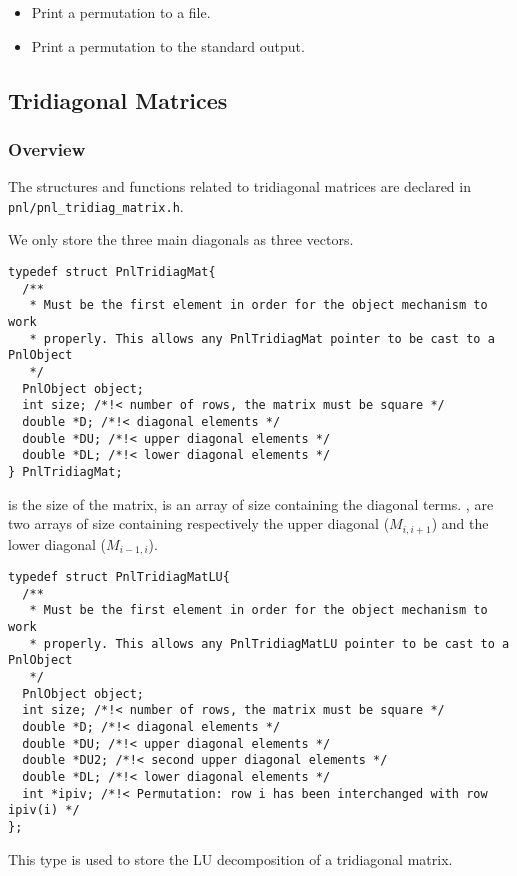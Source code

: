 \begin{itemize}
\item {}
  \sshortdescribe Print a permutation to a file.  

\item {}
  \sshortdescribe Print a permutation to the standard output.  
\end{itemize}



\subsection{Tridiagonal Matrices}
\subsubsection{Overview}

The structures and functions related to tridiagonal matrices are declared in
\verb!pnl/pnl_tridiag_matrix.h!. 

We only store the three main diagonals as three vectors.

\begin{verbatim}
typedef struct PnlTridiagMat{
  /**
   * Must be the first element in order for the object mechanism to work
   * properly. This allows any PnlTridiagMat pointer to be cast to a PnlObject
   */
  PnlObject object; 
  int size; /*!< number of rows, the matrix must be square */
  double *D; /*!< diagonal elements */
  double *DU; /*!< upper diagonal elements */
  double *DL; /*!< lower diagonal elements */
} PnlTridiagMat;
\end{verbatim}
 is the size of the matrix,  is an array of size 
containing the diagonal terms. ,
 are two arrays of size  containing respectively the upper
diagonal ($M_{i, i+1}$) and the lower diagonal ($M_{i-1, i}$). 

\begin{verbatim}
typedef struct PnlTridiagMatLU{
  /** 
   * Must be the first element in order for the object mechanism to work
   * properly. This allows any PnlTridiagMatLU pointer to be cast to a PnlObject
   */
  PnlObject object; 
  int size; /*!< number of rows, the matrix must be square */
  double *D; /*!< diagonal elements */
  double *DU; /*!< upper diagonal elements */
  double *DU2; /*!< second upper diagonal elements */
  double *DL; /*!< lower diagonal elements */
  int *ipiv; /*!< Permutation: row i has been interchanged with row ipiv(i) */
};
\end{verbatim}
This type is used to store the LU decomposition of a tridiagonal matrix. 

